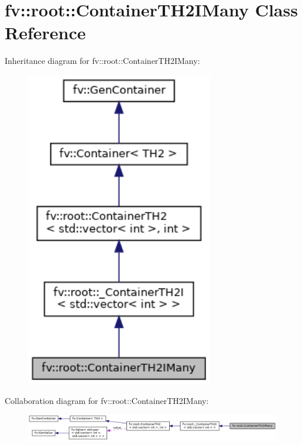 \hypertarget{classfv_1_1root_1_1ContainerTH2IMany}{}\section{fv\+:\+:root\+:\+:Container\+T\+H2\+I\+Many Class Reference}
\label{classfv_1_1root_1_1ContainerTH2IMany}


Inheritance diagram for fv\+:\+:root\+:\+:Container\+T\+H2\+I\+Many\+:
\nopagebreak
\begin{figure}[H]
\begin{center}
\leavevmode
\includegraphics[width=233pt]{classfv_1_1root_1_1ContainerTH2IMany__inherit__graph}
\end{center}
\end{figure}


Collaboration diagram for fv\+:\+:root\+:\+:Container\+T\+H2\+I\+Many\+:
\nopagebreak
\begin{figure}[H]
\begin{center}
\leavevmode
\includegraphics[width=350pt]{classfv_1_1root_1_1ContainerTH2IMany__coll__graph}
\end{center}
\end{figure}
